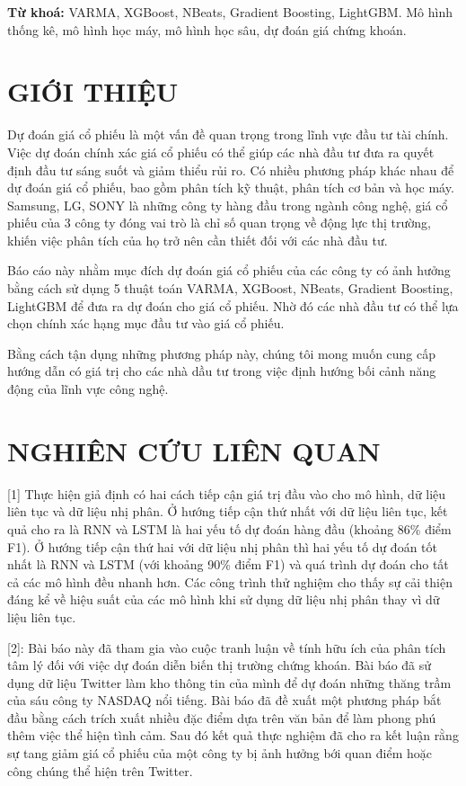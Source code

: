 \documentclass[conference]{IEEEtran}
\begin{document}
\vspace{1em} %


\textbf{Từ khoá:} VARMA, XGBoost, NBeats, Gradient Boosting, LightGBM. Mô hình thống kê, mô hình học máy, mô hình học sâu, dự đoán giá chứng khoán.




\section{GIỚI THIỆU}

Dự đoán giá cổ phiếu là một vấn đề quan trọng trong lĩnh vực đầu tư tài chính. Việc dự đoán chính xác giá cổ phiếu có thể giúp các nhà đầu tư đưa ra quyết định đầu tư sáng suốt và giảm thiểu rủi ro. Có nhiều phương pháp khác nhau để dự đoán giá cổ phiếu, bao gồm phân tích kỹ thuật, phân tích cơ bản và học máy. Samsung, LG, SONY là những công ty hàng đầu trong ngành công nghệ, giá cổ phiếu của 3 công ty đóng vai trò là chỉ số quan trọng về động lực thị trường, khiến việc phân tích của họ trở nên cần thiết đối với các nhà đầu tư. 

Báo cáo này nhằm mục đích dự đoán giá cổ phiếu của các công ty có ảnh hưởng bằng cách sử dụng 5 thuật toán VARMA, XGBoost, NBeats, Gradient Boosting, LightGBM để đưa ra dự đoán cho giá cổ phiếu. Nhờ đó các nhà đầu tư có thể lựa chọn chính xác hạng mục đầu tư vào giá cổ phiếu. 

Bằng cách tận dụng những phương pháp này, chúng tôi mong muốn cung cấp hướng dẫn có giá trị cho các nhà dầu tư trong việc định hướng bối cảnh năng động của lĩnh vực công nghệ. 


\section{NGHIÊN CỨU LIÊN QUAN}


[1] Thực hiện giả định có hai cách tiếp cận giá trị đầu vào cho mô hình, dữ liệu liên tục và dữ liệu nhị phân. Ở hướng tiếp cận thứ nhất với dữ liệu liên tục, kết quả cho ra là RNN và LSTM là hai yếu tố dự đoán hàng đầu (khoảng 86\% điểm F1). Ở hướng tiếp cận thứ hai với dữ liệu nhị phân thì hai yếu tố dự đoán tốt nhất là RNN và LSTM (với khoảng 90\% điểm F1) và quá trình dự đoán cho tất cả các mô hình đều nhanh hơn. Các công trình thử nghiệm cho thấy sự cải thiện đáng kể về hiệu suất của các mô hình khi sử dụng dữ liệu nhị phân thay vì dữ liệu liên tục.

[2]: Bài báo này đã tham gia vào cuộc tranh luận về tính hữu ích của phân tích tâm lý đối với việc dự đoán diễn biến thị trường chứng khoán. Bài báo đã sử dụng dữ liệu Twitter làm kho thông tin của mình để dự đoán những thăng trầm của sáu công ty NASDAQ nổi tiếng. Bài báo đã đề xuất một phương pháp bắt đầu bằng cách trích xuất nhiều đặc điểm dựa trên văn bản để làm phong phú thêm việc thể hiện tình cảm. Sau đó kết quả thực nghiệm đã cho ra kết luận rằng sự tang giảm giá cổ phiếu của một công ty bị ảnh hưởng bới quan điểm hoặc công chúng thể hiện trên Twitter.
\end{document}
